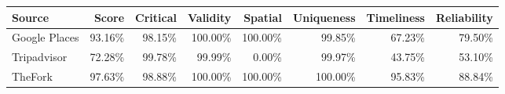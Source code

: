 {\tiny
\begin{tabular}{lrrrrrrr}
\toprule
Source & Score & Critical & Validity & Spatial & Uniqueness & Timeliness & Reliability \\
\midrule
Google Places & 93.16\% & 98.15\% & 100.00\% & 100.00\% & 99.85\% & 67.23\% & 79.50\% \\
Tripadvisor & 72.28\% & 99.78\% & 99.99\% & 0.00\% & 99.97\% & 43.75\% & 53.10\% \\
TheFork & 97.63\% & 98.88\% & 100.00\% & 100.00\% & 100.00\% & 95.83\% & 88.84\% \\
\bottomrule
\end{tabular}
}
